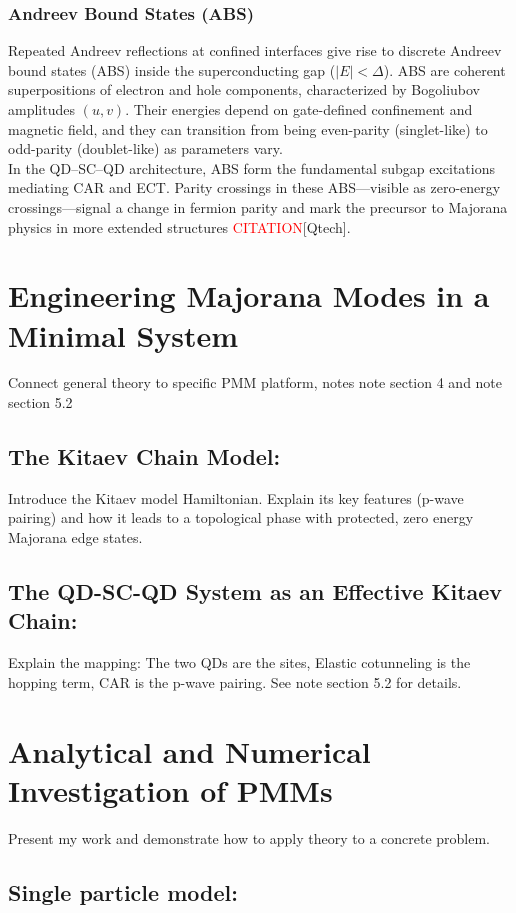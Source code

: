 \documentclass[11pt, letterpaper, titlepage]{article}
\begin{document}
\subsubsection{Andreev Bound States (ABS)}
Repeated Andreev reflections at confined interfaces give rise to discrete Andreev bound states (ABS) inside the superconducting gap ($|E|<\Delta$). ABS are coherent superpositions of electron and hole components, characterized by Bogoliubov amplitudes $(u,v)$. Their energies depend on gate-defined confinement and magnetic field, and they can transition from being even-parity (singlet-like) to odd-parity (doublet-like) as parameters vary.\\
In the QD–SC–QD architecture, ABS form the fundamental subgap excitations mediating CAR and ECT. Parity crossings in these ABS—visible as zero-energy crossings—signal a change in fermion parity and mark the precursor to Majorana physics in more extended structures \textcolor{red}{CITATION}[Qtech].

\section{Engineering Majorana Modes in a Minimal System}
Connect general theory to specific PMM platform, notes note section 4 and note section 5.2\par
\subsection{The Kitaev Chain Model:} Introduce the Kitaev model Hamiltonian. Explain its key features (p-wave pairing) and how it leads to a topological phase with protected, zero energy Majorana edge states.\par
\subsection{The QD-SC-QD System as an Effective Kitaev Chain:} Explain the mapping: The two QDs are the sites, Elastic cotunneling is the hopping term, CAR is the p-wave pairing. See note section 5.2 for details.\par

\section{Analytical and Numerical Investigation of PMMs}
Present my work and demonstrate how to apply theory to a concrete problem.\par
\subsection{Single particle model:}
\end{document}
